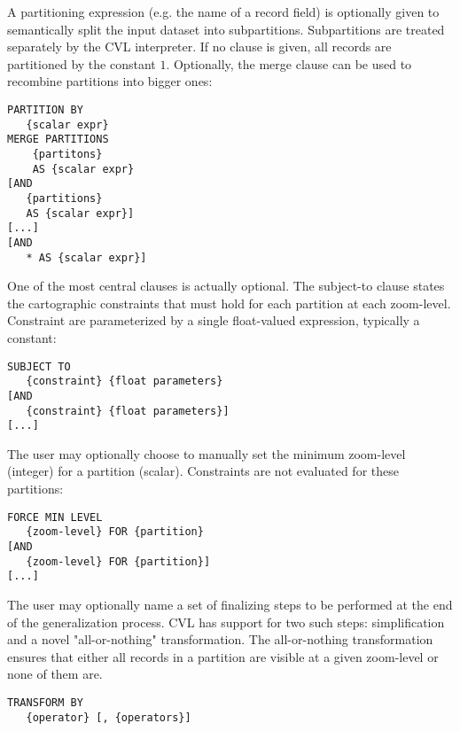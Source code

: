 A partitioning expression (e.g. the name of a record field) is optionally given to semantically split the input dataset into subpartitions. Subpartitions are treated separately by the CVL interpreter. If no clause is given, all records are partitioned by the constant $1$. Optionally, the merge clause can be used to recombine partitions into bigger ones:

\begin{lstlisting}
PARTITION BY
   {scalar expr}
MERGE PARTITIONS    
    {partitons}
    AS {scalar expr}
[AND 
   {partitions} 
   AS {scalar expr}]
[...]
[AND 
   * AS {scalar expr}]
\end{lstlisting}

One of the most central clauses is actually optional. The subject-to clause states the cartographic constraints that must hold for each partition at each zoom-level. Constraint are parameterized by a single float-valued expression, typically a constant:

\begin{lstlisting}
SUBJECT TO 
   {constraint} {float parameters} 
[AND
   {constraint} {float parameters}]
[...]
\end{lstlisting}

The user may optionally choose to manually set the minimum zoom-level (integer) for a partition (scalar). Constraints are not evaluated for these partitions:

\begin{lstlisting}
FORCE MIN LEVEL
   {zoom-level} FOR {partition}
[AND
   {zoom-level} FOR {partition}]
[...]
\end{lstlisting}

The user may optionally name a set of finalizing steps to be performed at the end of the generalization process. CVL has support for two such steps: simplification and a novel "all-or-nothing" transformation. The all-or-nothing transformation ensures that either all records in a partition are visible at a given zoom-level or none of them are.

\begin{lstlisting}
TRANSFORM BY
   {operator} [, {operators}]
\end{lstlisting}

